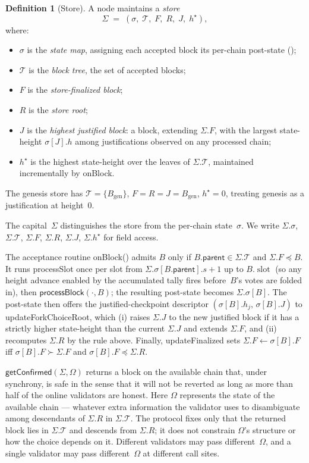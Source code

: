 \ifx\litemode\undefined\documentclass{article}\fi
\newcommand{\genesis}{\ensuremath{B_{\mathrm{gen}}}}
\newcommand{\T}[0]{\ensuremath{\mathcal{T}}}
\newcommand{\slot}[0]{\ensuremath{\operatorname{\mathrm{slot}}}}
\newcommand{\parent}{\mathsf{parent}}
\newcommand{\processSlot}{\textsf{processSlot}\xspace}
\newcommand{\processBlock}{\textsf{processBlock}\xspace}
\newcommand{\onBlock}{\textsf{onBlock}\xspace}
\newcommand{\updateForkChoiceRoot}{\textsf{updateForkChoiceRoot}\xspace}
\newcommand{\updateFinalized}{\textsf{updateFinalized}\xspace}
\newcommand{\getConfirmed}{\textsf{getConfirmed}\xspace}
\theoremstyle{plain}
\theoremstyle{definition}
\newtheorem{definition}[theorem]{Definition}
\theoremstyle{remark}
\begin{document}
\begin{definition}[Store]\label{def:store}
A node maintains a \emph{store}
\[
  \Sigma \;=\; (\sigma,\; \T,\; F,\; R,\; J,\; h^\star),
\]
where:
\begin{itemize}
  \item $\sigma$ is the \emph{state map}, assigning each accepted block its per-chain post-state ();
  \item $\T$ is the \emph{block tree}, the set of accepted blocks;
  \item $F$ is the \emph{store-finalized block};
  \item $R$ is the \emph{store root};
  \item $J$ is the \emph{highest justified block}: a block, extending $\Sigma.F$, with the largest state-height $\sigma[J].h$ among justifications observed on any processed chain;
  \item $h^\star$ is the highest state-height over the leaves of $\Sigma.\T$, maintained incrementally by \onBlock.
\end{itemize}
The genesis store has $\T = \{\genesis\}$, $F = R = J = \genesis$, $h^\star = 0$, treating genesis as a justification at height~$0$.
\end{definition}

The capital~$\Sigma$ distinguishes the store from the per-chain state~$\sigma$.
We write $\Sigma.\sigma$, $\Sigma.\T$, $\Sigma.F$, $\Sigma.R$, $\Sigma.J$, $\Sigma.h^\star$ for field access.

The acceptance routine \onBlock () admits $B$ only if $B.\parent \in \Sigma.\T$ and $\Sigma.F \preceq B$.
It runs \processSlot once per slot from $\Sigma.\sigma[B.\parent].s + 1$ up to $B.\slot$ (so any height advance enabled by the accumulated tally fires before~$B$'s votes are folded in), then $\processBlock(\cdot, B)$; the resulting post-state becomes $\Sigma.\sigma[B]$.
The post-state then offers the justified-checkpoint descriptor $(\sigma[B].h_j,\, \sigma[B].J)$ to \updateForkChoiceRoot, which (i) raises $\Sigma.J$ to the new justified block if it has a strictly higher state-height than the current $\Sigma.J$ and extends $\Sigma.F$, and (ii) recomputes $\Sigma.R$ by the rule above.
Finally, \updateFinalized sets $\Sigma.F \gets \sigma[B].F$ iff $\sigma[B].F \succ \Sigma.F$ and $\sigma[B].F \preceq \Sigma.R$.

$\getConfirmed(\Sigma, \Omega)$ returns a block on the available chain that, under synchrony, is safe in the sense that it will not be reverted as long as more than half of the online validators are honest. Here $\Omega$ represents the state of the available chain --- whatever extra information the validator uses to disambiguate among descendants of $\Sigma.R$ in $\Sigma.\T$. The protocol fixes only that the returned block lies in $\Sigma.\T$ and descends from $\Sigma.R$; it does not constrain $\Omega$'s structure or how the choice depends on it. Different validators may pass different~$\Omega$, and a single validator may pass different~$\Omega$ at different call sites.
\end{document}
